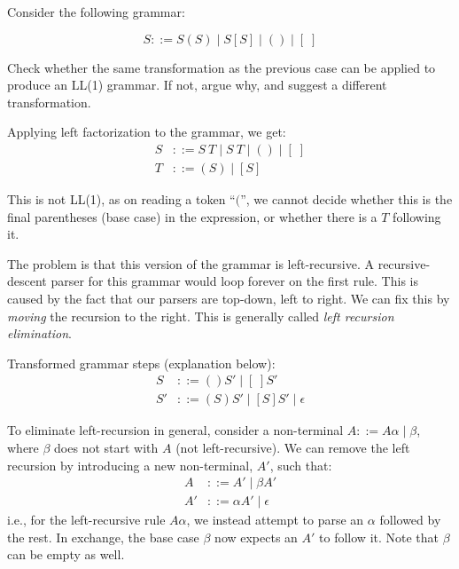 \begin{exercise}{}
  Consider the following grammar:

  \begin{equation*}
    S ::= S(S) \mid S[S] \mid () \mid [\;]
  \end{equation*}
    
  Check whether the same transformation as the previous case can be applied to
  produce an LL(1) grammar. If not, argue why, and suggest a different
  transformation.

  \begin{solution}
    Applying left factorization to the grammar, we get:
    \begin{align*}
      S &::= S ~T \mid S ~T \mid () \mid [\;] \\
      T &::= (S) \mid [S]
    \end{align*}

    This is not LL(1), as on reading a token ``\((\)'', we cannot decide whether
    this is the final parentheses (base case) in the expression, or whether
    there is a \(T\) following it.

    The problem is that this version of the grammar is left-recursive. A
    recursive-descent parser for this grammar would loop forever on the first
    rule. This is caused by the fact that our parsers are top-down, left to
    right. We can fix this by \emph{moving} the recursion to the right. This is
    generally called \emph{left recursion elimination}.

    Transformed grammar steps (explanation below):
    \begin{align*}
      S &::= ()S' \mid [\;]S' \\
      S' &::= (S)S' \mid [S]S' \mid \epsilon
    \end{align*}

    To eliminate left-recursion in general, consider a non-terminal \(A ::=
    A\alpha \mid \beta\), where \(\beta\) does not start with \(A\) (not
    left-recursive). We can remove the left recursion by introducing a new
    non-terminal, \(A'\), such that:
    \begin{align*}
      A &::= A' \mid \beta A' \\
      A' &::= \alpha A' \mid \epsilon
    \end{align*}
    i.e., for the left-recursive rule \(A\alpha\), we instead attempt to parse
    an \(\alpha\) followed by the rest. In exchange, the base case \(\beta\) now
    expects an \(A'\) to follow it.
    Note that \(\beta\) can be empty as well.
    

\end{solution}
\end{exercise}
